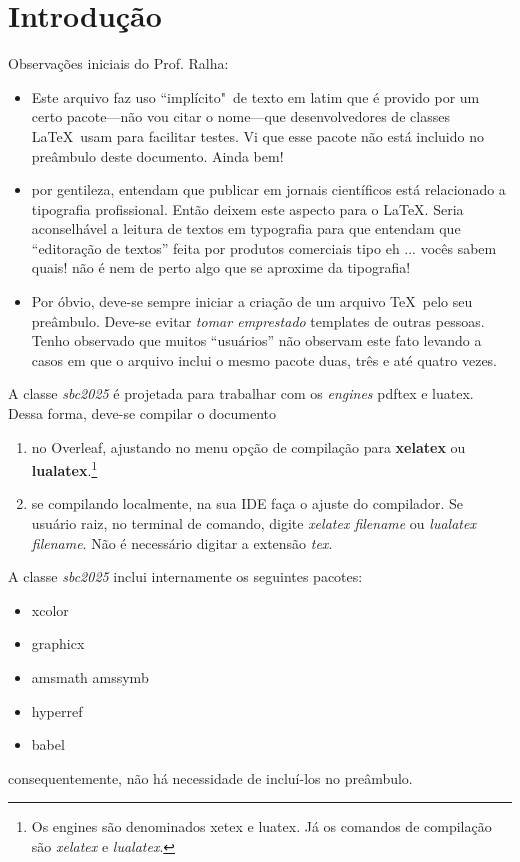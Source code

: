 \documentclass[portuguese]{sbc2025}%
\begin{document}
\section{Introdução}
\label{sec:intro}

Observações iniciais do Prof. Ralha:
\begin{itemize}
    \item Este arquivo faz uso ``implícito"\ de texto em latim que é provido por um certo pacote---não vou citar o nome---que desenvolvedores de classes \LaTeX\ usam para facilitar testes. Vi que esse pacote não está incluido no preâmbulo deste documento. Ainda bem!
    \item por gentileza, entendam que publicar em jornais científicos está relacionado a tipografia profissional. Então deixem este aspecto para o \LaTeX. Seria aconselhável a leitura de textos em typografia para que entendam que ``editoração de textos'' feita por produtos comerciais tipo eh ... vocês sabem quais! não é nem de perto algo que se aproxime da tipografia!
    \item Por óbvio, deve-se sempre iniciar a criação de um arquivo \TeX\ pelo seu preâmbulo. Deve-se evitar \textit{tomar emprestado} templates de outras pessoas. Tenho observado que muitos ``usuários'' não observam este fato levando a casos em que o arquivo inclui o mesmo pacote duas, três e até quatro vezes.
\end{itemize}

A classe \textsl{sbc2025} é projetada para trabalhar com os \textit{engines} pdftex e luatex. Dessa forma, deve-se compilar o documento 
\begin{enumerate}
    \item no Overleaf, ajustando no menu opção de compilação para \textbf{xelatex} ou \textbf{lualatex}.\footnote{Os engines são denominados xetex e luatex. Já os comandos de compilação são \textsl{xelatex} e \textsl{lualatex}.}
    \item se compilando localmente, na sua IDE faça o ajuste do compilador. Se usuário raiz, no terminal de comando, digite \textsl{xelatex filename} ou \textsl{lualatex filename}. Não é necessário digitar a extensão \textsl{tex}.
\end{enumerate}

A classe \textsl{sbc2025} inclui internamente os seguintes pacotes:
\begin{itemize}
    \item xcolor
    \item graphicx
    \item amsmath amssymb
    \item hyperref
    \item babel
\end{itemize}
\noindent consequentemente, não há necessidade de incluí-los no preâmbulo.
\end{document}
